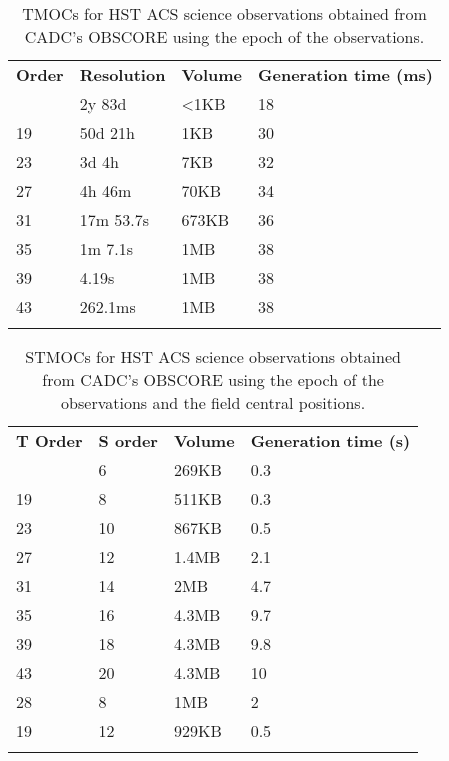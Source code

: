 \begin{table}[!htbp]
\begin{center}
{\scriptsize
\begin{tabular}{p{}p{}p{}p{}}
\sptablerule
\textbf{Order} & \textbf{Resolution} & \textbf{Volume} & \textbf{Generation \newline time (ms)}\\
\sptablerule
15&	2y 83d&	<1KB&	18 \\
19&	50d 21h	&1KB&	30 \\
23&	3d 4h&	7KB&	32 \\
27&	4h 46m&	70KB&	34 \\
31&	17m 53.7s&	673KB&	36 \\
35&	1m 7.1s&	1MB&	38 \\
39&	4.19s&	1MB&	38 \\
43&	262.1ms&	1MB&	38 \\
\sptablerule
\end{tabular}
\caption[TMOC performances]{TMOCs for HST ACS science observations obtained from CADC's OBSCORE using the epoch of the observations.}
\normalsize
}
\label{table:tmocsizeacs}
\end{center}
\end{table}


\begin{table}[!htbp]
\begin{center}
{\scriptsize
\begin{tabular}{p{}p{}p{}p{}}
\sptablerule
\textbf{T Order} & \textbf{S order} & \textbf{Volume} & \textbf{Generation \newline time (s)}\\
\sptablerule
15&	6&	269KB&	0.3\\
19&	8&	511KB&	0.3\\
23&	10&	867KB&	0.5\\
27&	12&	1.4MB&	2.1\\
31&	14&	2MB&	4.7\\
35&	16&	4.3MB&	9.7\\
39&	18&	4.3MB&	9.8\\
43&	20&	4.3MB&	10\\
28&	8&	1MB&	2\\
19&	12&	929KB&	0.5\\
\sptablerule
\end{tabular}
\caption[STMOC performances]{STMOCs for HST ACS science observations obtained from CADC's OBSCORE using the epoch of the observations and the field central positions.}
\normalsize
}
\label{table:tmocsizeacs}
\end{center}
\end{table}

